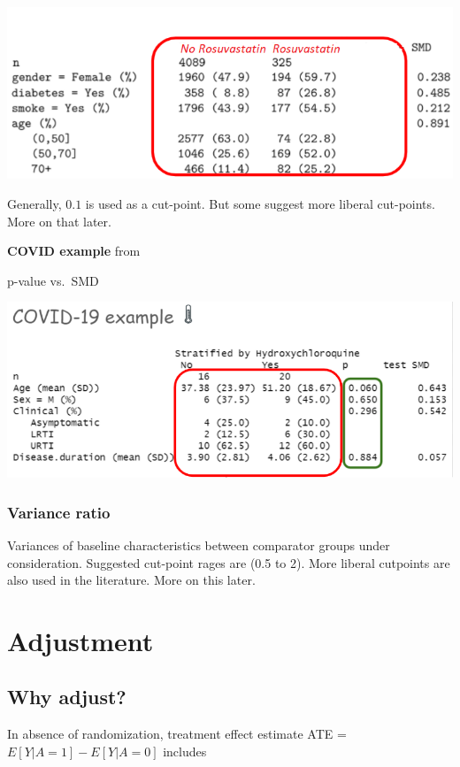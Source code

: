 \documentclass[
]{book}
\begin{document}
\includegraphics{images/SMD.png}

Generally, \(0.1\) is used as a cut-point. But some suggest more liberal cut-points. More on that later.

\textbf{COVID example} from \citet{gautret2020hydroxychloroquine}

p-value vs.~SMD

\includegraphics{images/hql.png}

\hypertarget{variance-ratio}{%
\subsubsection{Variance ratio}\label{variance-ratio}}

Variances of baseline characteristics between comparator groups under consideration. Suggested cut-point rages are (0.5 to 2). More liberal cutpoints are also used in the literature. More on this later.

\hypertarget{adjustment}{%
\section{Adjustment}\label{adjustment}}

\hypertarget{why-adjust}{%
\subsection{Why adjust?}\label{why-adjust}}

In absence of randomization, treatment effect estimate ATE = \(E[Y|A=1] - E[Y|A=0]\) includes
\end{document}
